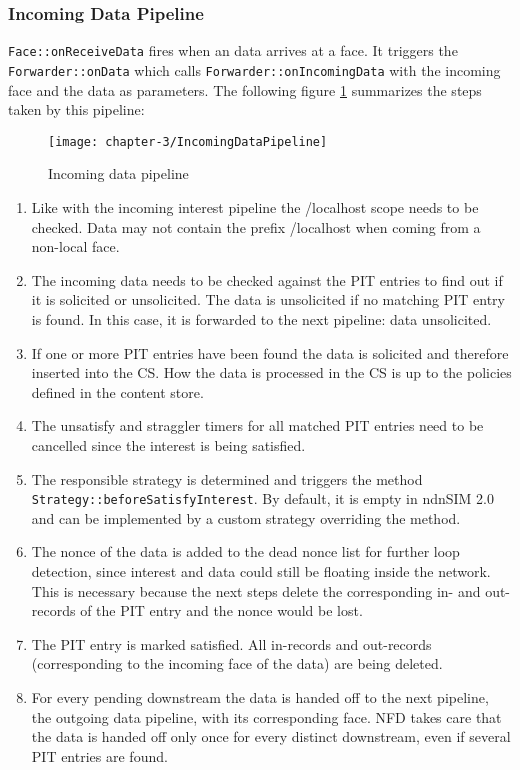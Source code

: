 \subsubsection{Incoming Data Pipeline}

 \texttt{Face::onReceiveData} fires when an data arrives at a face. It triggers the  \texttt{Forwarder::onData} which calls \texttt{Forwarder::onIncomingData} with the incoming face and the data as parameters.
The following figure \ref{fig:IncomingDataPipeline} summarizes the steps taken by this pipeline:

\begin{figure}[H]
  \centering
  \texttt{[image: chapter-3/IncomingDataPipeline]}
  \caption{Incoming data pipeline}
  \label{fig:IncomingDataPipeline}
\end{figure}

\begin{enumerate}
\item Like with the incoming interest pipeline the /localhost scope needs to be checked. Data may not contain the prefix /localhost when coming from a non-local face.
\item The incoming data needs to be checked against the PIT entries to find out if it is solicited or unsolicited. The data is unsolicited if no matching PIT entry is found. In this case, it is forwarded to the next pipeline: data unsolicited.
\item If one or more PIT entries have been found the data is solicited and therefore inserted into the CS. How the data is processed in the CS is up to the policies defined in the content store.
\item The unsatisfy and straggler timers for all matched PIT entries need to be cancelled since the interest is being satisfied.
\item The responsible strategy is determined and triggers the method \texttt{Strategy::beforeSatisfyInterest}. By default, it is empty in ndnSIM 2.0 and can be implemented by a custom strategy overriding the method.
\item The nonce of the data is added to the dead nonce list for further loop detection, since interest and data could still be floating inside the network. This is necessary because the next steps delete the corresponding in- and out-records of the PIT entry and the nonce would be lost. 
\item The PIT entry is marked satisfied. All in-records and out-records (corresponding to the incoming face of the data) are being deleted.
\item For every pending downstream the data is handed off to the next pipeline, the outgoing data pipeline, with its corresponding face. NFD takes care that the data is handed off only once for every distinct downstream, even if several PIT entries are found.
\end{enumerate}


